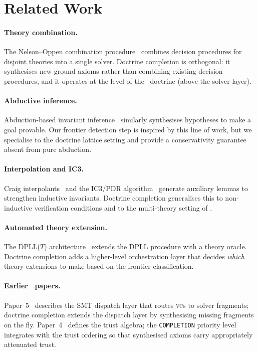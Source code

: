 \documentclass[11pt]{article}
\begin{document}
\section{Related Work}\label{sec:related}

\paragraph{Theory combination.}
The Nelson--Oppen combination procedure~\cite{NelsonOppen79}
combines decision procedures for disjoint theories into a single
solver.  Doctrine completion is orthogonal: it synthesises new
ground axioms rather than combining existing decision procedures,
and it operates at the level of the \JuGeo\ doctrine (above the
solver layer).

\paragraph{Abductive inference.}
Abduction-based invariant inference~\cite{Dillig13} similarly
synthesises hypotheses to make a goal provable.  Our frontier
detection step is inspired by this line of work, but we specialise
to the doctrine lattice setting and provide a conservativity guarantee
absent from pure abduction.

\paragraph{Interpolation and IC3.}
Craig interpolants~\cite{McMillan03} and the IC3/PDR
algorithm~\cite{Bradley11} generate auxiliary lemmas to strengthen
inductive invariants.  Doctrine completion generalises this to
non-inductive verification conditions and to the multi-theory
setting of \JuGeo.

\paragraph{Automated theory extension.}
The DPLL($T$) architecture~\cite{Nieuwenhuis06} extends the DPLL
procedure with a theory oracle.  Doctrine completion adds a higher-level
orchestration layer that decides \emph{which} theory extensions to make
based on the frontier classification.

\paragraph{Earlier \JuGeo\ papers.}
Paper~5~\cite{JuGeo05} describes the SMT dispatch layer that routes
\textsc{vc}s to solver fragments; doctrine completion extends the
dispatch layer by synthesising missing fragments on the fly.
Paper~4~\cite{JuGeo04} defines the trust algebra; the
\texttt{COMPLETION} priority level integrates with the trust ordering
so that synthesised axioms carry appropriately attenuated trust.
\end{document}
